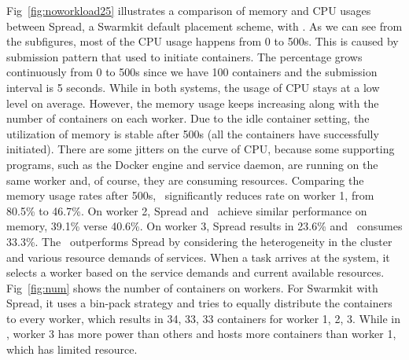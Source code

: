 Fig~\ref{fig:noworkload25} illustrates a comparison of memory and CPU usages between Spread, 
a Swarmkit default placement scheme, with \sol. As we can see from the subfigures, most of the CPU usage happens from 0 to 500s.
This is caused by submission pattern that used to initiate containers. The percentage grows continuously from 0 to 500s since
we have 100 containers and the submission interval is 5 seconds. While in both systems, the usage of CPU stays at a low level on average. 
However, the memory usage keeps increasing along with the number of containers on each worker. 
Due to the idle container setting, the utilization of memory is stable after 500s (all the containers 
have successfully initiated). There are some jitters on the curve of CPU, because 
some supporting programs, such as the Docker engine and service daemon, are running on the same worker and, of course, they are consuming resources. 
Comparing the memory usage rates after 500s, \sol~significantly reduces rate on worker 1, from 80.5\% to 46.7\%. 
On worker 2, Spread and \sol~achieve similar performance on memory, 39.1\% verse 40.6\%.
On worker 3, Spread results in 23.6\% and \sol~consumes 33.3\%. The \sol~outperforms Spread by considering the heterogeneity in the cluster and 
various resource demands of services. When a task arrives at the system, it selects a worker based on the service demands and current available resources.
Fig~\ref{fig:num} shows the number of containers on workers. For Swarmkit with Spread, it uses a bin-pack strategy and tries to equally distribute
the containers to every worker, which results in 34, 33, 33 containers for worker 1, 2, 3. While in \sol, worker 3 has more power than others and hosts more 
containers than worker 1, which has limited resource.
\begin{comment}
\begin{figure}[h]
\centering
\begin{minipage}[t]{width=0.24\linewidth}
\centering
\texttt{[image: 25containernum]}
\caption{Number of containers on each worker}
\label{fig:num} 
\end{minipage}
~
\begin{minipage}[t]{width=0.24\linewidth}
\centering
\texttt{[image: 25net]}
\caption{Network usage comparison on worker 3}
\label{fig:25net} 
\end{minipage}
\end{figure}
\end{comment}


